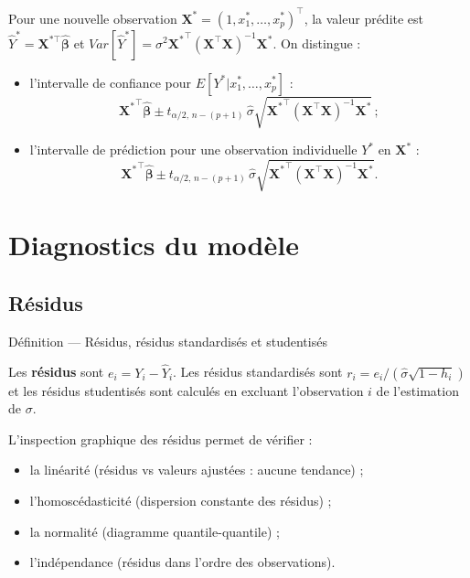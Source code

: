 \documentclass[
  french,
  letterpaper,
  DIV=11,
  numbers=noendperiod]{scrreprt}
\begin{document}
Pour une nouvelle observation
\(\boldsymbol{X}^* = (1, x_1^*,\ldots,x_p^*)^\top\), la valeur prédite
est \(\hat Y^* = \boldsymbol{X}^{*\top}\hat{\boldsymbol{\beta}}\) et
\(Var[\hat Y^*] = \sigma^2 {\boldsymbol{X}^*}^\top (\boldsymbol{X}^\top \boldsymbol{X})^{-1} \boldsymbol{X}^*\).
On distingue :

\begin{itemize}
\item
  l'intervalle de confiance pour \(E[Y^*|x_1^*,\ldots,x_p^*]\) :
  \[{\boldsymbol{X}^*}^\top\hat{\boldsymbol{\beta}}\pm t_{\alpha/2,\,n-(p+1)}\,\hat\sigma\sqrt{{\boldsymbol{X}^*}^\top (\boldsymbol{X}^\top \boldsymbol{X})^{-1} \boldsymbol{X}^*}\,;\]
\item
  l'intervalle de prédiction pour une observation individuelle \(Y^*\)
  en \(\boldsymbol{X}^*\) :
  \[{\boldsymbol{X}^*}^\top\hat{\boldsymbol{\beta}} \pm t_{\alpha/2,\,n-(p+1)}\,\hat\sigma\sqrt{{\boldsymbol{X}^*}^\top (\boldsymbol{X}^\top \boldsymbol{X})^{-1} \boldsymbol{X}^*}.\]
\end{itemize}

\section{Diagnostics du modèle}\label{diagnostics-du-moduxe8le}

\subsection{Résidus}\label{ruxe9sidus}

{Définition --- Résidus, résidus standardisés et studentisés}

Les \textbf{résidus} sont \(e_i = Y_i - \hat Y_i\). Les résidus
standardisés sont \(r_i = e_i / (\hat\sigma\sqrt{1-h_i})\) et les
résidus studentisés sont calculés en excluant l'observation \(i\) de
l'estimation de \(\sigma\).

L'inspection graphique des résidus permet de vérifier :

\begin{itemize}
\item
  la linéarité (résidus vs valeurs ajustées : aucune tendance) ;
\item
  l'homoscédasticité (dispersion constante des résidus) ;
\item
  la normalité (diagramme quantile-quantile) ;
\item
  l'indépendance (résidus dans l'ordre des observations).
\end{itemize}
\end{document}
